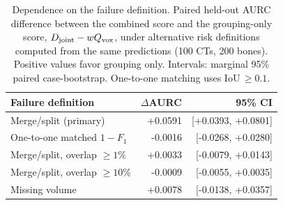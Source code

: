 \begin{table}[t]
\caption{Dependence on the failure definition. Paired held-out AURC difference between the combined score and the grouping-only score, $D_{\rm joint}-wQ_{\rm vox}$, under alternative risk definitions computed from the same predictions (100 CTs, 200 bones). Positive values favor grouping only. Intervals: marginal 95\% paired case-bootstrap. One-to-one matching uses IoU\,$\geq0.1$.}
\label{tab:sensitivity}
\centering\footnotesize
\begin{tabular}{lrr}
\toprule
Failure definition & $\Delta$AURC & 95\% CI \\
\midrule
Merge/split (primary) & +0.0591 & [+0.0393, +0.0801] \\
One-to-one matched $1-F_1$ & -0.0016 & [-0.0268, +0.0280] \\
Merge/split, overlap $\geq 1\%$ & +0.0033 & [-0.0079, +0.0143] \\
Merge/split, overlap $\geq 10\%$ & -0.0009 & [-0.0055, +0.0035] \\
Missing volume & +0.0078 & [-0.0138, +0.0357] \\
\bottomrule
\end{tabular}
\end{table}
